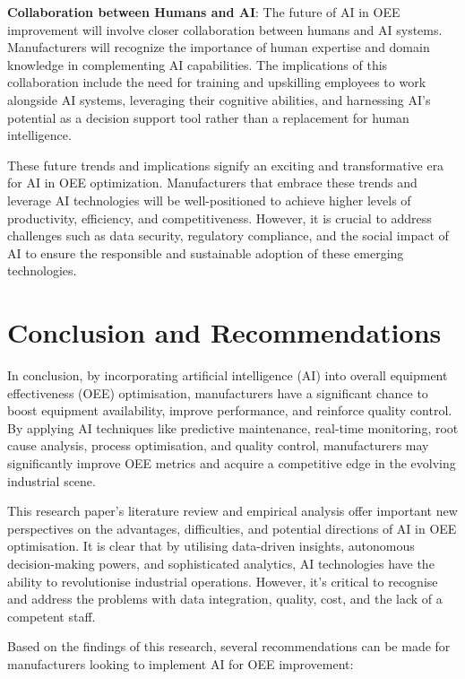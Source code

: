 \documentclass[12pt]{article}
\begin{document}
\textbf{Collaboration between Humans and AI}:
The future of AI in OEE improvement will involve closer collaboration between humans and AI systems. Manufacturers will recognize the importance of human expertise and domain knowledge in complementing AI capabilities. The implications of this collaboration include the need for training and upskilling employees to work alongside AI systems, leveraging their cognitive abilities, and harnessing AI's potential as a decision support tool rather than a replacement for human intelligence.
\vspace{0.7cm}

These future trends and implications signify an exciting and transformative era for AI in OEE optimization. Manufacturers that embrace these trends and leverage AI technologies will be well-positioned to achieve higher levels of productivity, efficiency, and competitiveness. However, it is crucial to address challenges such as data security, regulatory compliance, and the social impact of AI to ensure the responsible and sustainable adoption of these emerging technologies.



\section{Conclusion and Recommendations}
In conclusion, by incorporating artificial intelligence (AI) into overall equipment effectiveness (OEE) optimisation, manufacturers have a significant chance to boost equipment availability, improve performance, and reinforce quality control. By applying AI techniques like predictive maintenance, real-time monitoring, root cause analysis, process optimisation, and quality control, manufacturers may significantly improve OEE metrics and acquire a competitive edge in the evolving industrial scene.


This research paper's literature review and empirical analysis offer important new perspectives on the advantages, difficulties, and potential directions of AI in OEE optimisation. It is clear that by utilising data-driven insights, autonomous decision-making powers, and sophisticated analytics, AI technologies have the ability to revolutionise industrial operations. However, it's critical to recognise and address the problems with data integration, quality, cost, and the lack of a competent staff.


Based on the findings of this research, several recommendations can be made for manufacturers looking to implement AI for OEE improvement:
\vspace{0.3cm}
\end{document}
